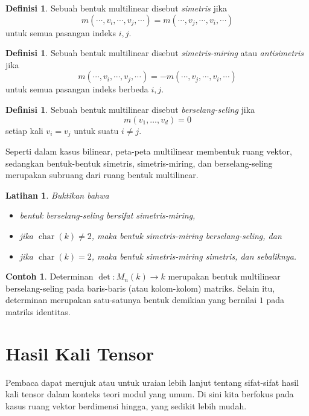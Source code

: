 \documentclass[12pt]{article}
\theoremstyle{plain}
\newtheorem{exercise}[theorem]{Latihan}
\theoremstyle{definition}
\newtheorem{definition}[theorem]{Definisi}
\newtheorem{example}[theorem]{Contoh}
\theoremstyle{remark}
\numberwithin{equation}{section}
\begin{document}
\begin{definition}
Sebuah bentuk multilinear disebut
\emph{simetris} jika
\[
m(\cdots,v_i,\cdots,v_j,\cdots) = m(\cdots,v_j,\cdots,v_i,\cdots)
\]
untuk semua pasangan indeks $i,j$.
\end{definition}

\begin{definition}
Sebuah bentuk multilinear disebut \emph{simetris-miring} atau \emph{antisimetris} jika
\[
m(\cdots,v_i,\cdots,v_j,\cdots) = -m(\cdots,v_j,\cdots,v_i,\cdots)
\]
untuk semua pasangan indeks berbeda $i,j$.
\end{definition}

\begin{definition}
Sebuah bentuk multilinear disebut \emph{berselang-seling} jika
\[
m(v_1,\ldots,v_d) = 0
\]
setiap kali $v_i=v_j$ untuk suatu $i \ne j$.
\end{definition}

Seperti dalam kasus bilinear, peta-peta multilinear membentuk ruang vektor,
sedangkan bentuk-bentuk simetris, simetris-miring, dan berselang-seling
merupakan subruang dari ruang bentuk multilinear.

\begin{exercise}
Buktikan bahwa
\begin{itemize}
\item bentuk berselang-seling bersifat simetris-miring,
\item jika $\operatorname{char}(k) \ne 2$, maka bentuk simetris-miring
berselang-seling, dan
\item jika $\operatorname{char}(k) = 2$, maka bentuk simetris-miring
simetris, dan sebaliknya.
\end{itemize}
\end{exercise}

\begin{example}
Determinan $\det : M_n(k) \to k$ merupakan bentuk multilinear berselang-seling
pada baris-baris (atau kolom-kolom) matriks.
Selain itu, determinan merupakan satu-satunya bentuk demikian yang bernilai $1$ pada matriks identitas.
\end{example}

\section{Hasil Kali Tensor}

Pembaca dapat merujuk \cite[10.4]{DF} atau \cite[XVI]{Lang}
untuk uraian lebih lanjut tentang sifat-sifat hasil kali tensor dalam konteks
teori modul yang umum.
Di sini kita berfokus pada kasus ruang vektor berdimensi hingga,
yang sedikit lebih mudah.
\end{document}
